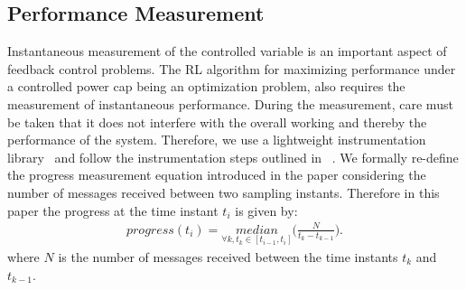 \fi 

\subsection{Performance Measurement} \label{ch3:subsec:Performance_Measurement} Instantaneous measurement of the controlled variable is an important aspect of feedback control problems. The RL algorithm for maximizing performance under a controlled power cap being an optimization problem, also requires the measurement of instantaneous performance. During the measurement, care must be taken that it does not interfere with the overall working and thereby the performance of the system.  Therefore, we use a lightweight instrumentation library~\cite{ramesh2019understanding} and follow the instrumentation steps outlined in ~\cite{cerf2021sustaining}.  We formally re-define the progress measurement equation introduced in the paper \cite{ramesh2019understanding} considering the number of messages received between two sampling instants. Therefore in this paper the progress at the time instant $t_i$ is given by:
 \begin{equation}
    \begin{aligned}
                progress(t_i) = \underset{\forall k,t_k \in [t_{i-1},t_i]}{median}\bigg(\frac{N}{t_k-t_{k-1}} \bigg).
    \end{aligned}
    \label{ch3:eq:progress-calculation}
\end{equation}
where $N$ is the number of messages received between the time instants $t_k$ and $t_{k-1}$.


